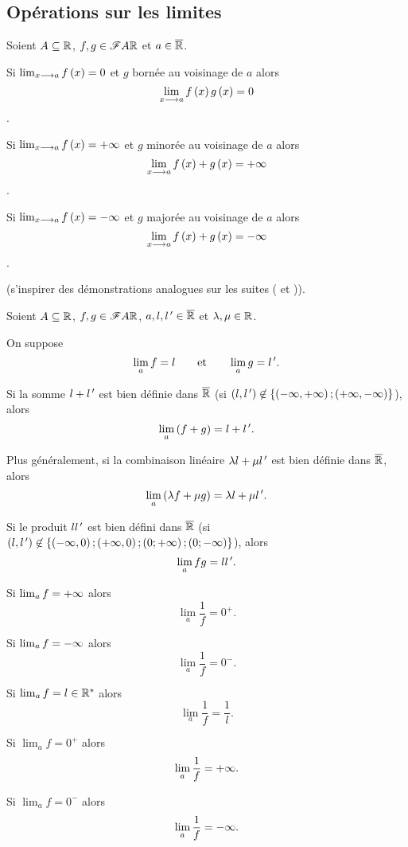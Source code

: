 \subsection{Opérations sur les limites}

\begin{prop}
Soient \(A\subseteq\mathbb{R}\), \(f,g\in\mathscr{F}{A}{\mathbb{R}}\) et \(a\in\overline{\mathbb{R}}\).

Si \(\lim_{x\longrightarrow a}f\left(x\right)=0\) et \(g\) bornée au voisinage de \(a\) alors \[\lim_{x\longrightarrow a}f\left(x\right)g\left(x\right)=0\].

Si \(\lim_{x\longrightarrow a}f\left(x\right)=+\infty\) et \(g\) minorée au voisinage de \(a\) alors \[\lim_{x\longrightarrow a}f\left(x\right)+g\left(x\right)=+\infty\].

Si \(\lim_{x\longrightarrow a}f\left(x\right)=-\infty\) et \(g\) majorée au voisinage de \(a\) alors \[\lim_{x\longrightarrow a}f\left(x\right)+g\left(x\right)=-\infty\].
\end{prop}

\begin{dem}
 (s'inspirer des démonstrations analogues sur les suites ( et )).
\end{dem}

\begin{prop}
Soient \(A\subseteq\mathbb{R}\), \(f,g\in\mathscr{F}{A}{\mathbb{R}}\), \(a,l,l^{\,\prime}\in\overline{\mathbb{R}}\) et \(\lambda,\mu\in\mathbb{R}\).

On suppose \[\lim_af=l\qquad\text{et}\qquad\lim_ag=l^{\,\prime}.\]

Si la somme \(l+l^{\,\prime}\) est bien définie dans \(\overline{\mathbb{R}}\) (\cad si \(\left(l,l^{\,\prime}\right)\not\in\left\lbrace\left(-\infty,+\infty\right);\left(+\infty,-\infty\right)\right\rbrace\)), alors \[\lim_a\left(f+g\right)=l+l^{\,\prime}.\]

Plus généralement, si la combinaison linéaire \(\lambda l+\mu l^{\,\prime}\) est bien définie dans \(\overline{\mathbb{R}}\), alors \[\lim_a\left(\lambda f+\mu g\right)=\lambda l+\mu l^{\,\prime}.\]

Si le produit \(ll^{\,\prime}\) est bien défini dans \(\overline{\mathbb{R}}\) (\cad si \(\left(l,l^{\,\prime}\right)\not\in\left\lbrace\left(-\infty,0\right);\left(+\infty,0\right);\left(0;+\infty\right);\left(0;-\infty\right)\right\rbrace\)), alors \[\lim_afg=ll^{\,\prime}.\]

Si \(\lim_af=+\infty\) alors \[\lim_a\dfrac{1}{f}=0^+.\]

Si \(\lim_af=-\infty\) alors \[\lim_a\dfrac{1}{f}=0^-.\]

Si \(\lim_af=l\in\mathbb{R}^*\) alors \[\lim_a\dfrac{1}{f}=\dfrac{1}{l}.\]

Si \(\lim_af=0^+\) alors \[\lim_a\dfrac{1}{f}=+\infty.\]

Si \(\lim_af=0^-\) alors \[\lim_a\dfrac{1}{f}=-\infty.\]
\end{prop}

